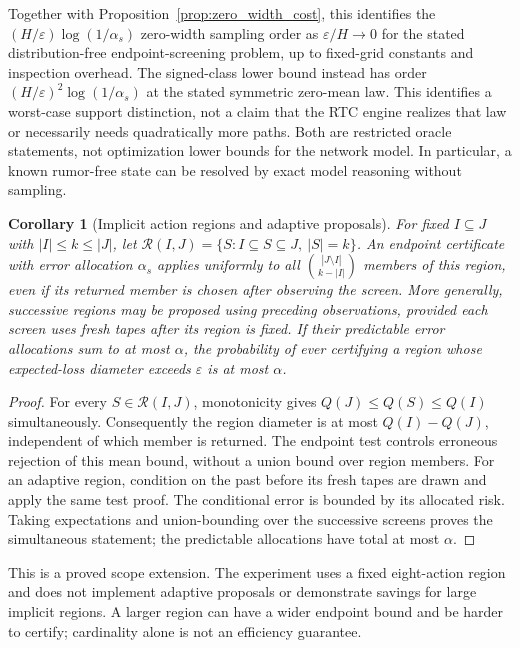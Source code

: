 \documentclass[preprint,11pt,sort&compress]{elsarticle}
\newtheorem{corollary}[theorem]{Corollary}
\begin{document}
Together with Proposition~\ref{prop:zero_width_cost}, this identifies the
$ (H/\varepsilon)\log(1/\alpha_s)$ zero-width sampling order as $\varepsilon/H\to0$ for the stated
distribution-free endpoint-screening problem, up to fixed-grid constants
and inspection overhead. The signed-class lower bound instead has order
$(H/\varepsilon)^2\log(1/\alpha_s)$ at the stated symmetric zero-mean
law. This identifies a worst-case support distinction, not a claim that
the RTC engine realizes that law or necessarily needs quadratically more
paths. Both are restricted oracle statements, not optimization lower
bounds for the network model. In particular, a known
rumor-free state can be resolved by exact model reasoning without sampling.

\begin{corollary}[Implicit action regions and adaptive proposals]
\label{cor:implicit_region}
For fixed $I\subseteq J$ with $|I|\le k\le|J|$, let
$\mathcal R(I,J)=\{S:I\subseteq S\subseteq J,\ |S|=k\}$. An endpoint
certificate with error allocation $\alpha_s$ applies uniformly to all
$\binom{|J\setminus I|}{k-|I|}$ members of this region, even if its returned
member is chosen after observing the screen. More generally, successive
regions may be proposed using preceding observations, provided each screen
uses fresh tapes after its region is fixed. If their predictable error
allocations sum to at most $\alpha$, the probability of ever certifying a
region whose expected-loss diameter exceeds $\varepsilon$ is at most
$\alpha$.
\end{corollary}
\begin{proof}
For every $S\in\mathcal R(I,J)$, monotonicity gives
$Q(J)\le Q(S)\le Q(I)$ simultaneously. Consequently the region diameter is
at most $Q(I)-Q(J)$, independent of which member is returned. The endpoint
test controls erroneous rejection of this mean bound, without a union
bound over region members. For an adaptive region, condition on the past
before its fresh tapes are drawn and apply the same test proof. The
conditional error is bounded by its allocated risk. Taking expectations
and union-bounding over the successive screens proves the simultaneous
statement; the predictable allocations have total at most $\alpha$.
\end{proof}
This is a proved scope extension. The experiment uses a fixed eight-action
region and does not implement adaptive proposals or demonstrate savings
for large implicit regions. A larger region can have a wider endpoint
bound and be harder to certify; cardinality alone is not an efficiency
guarantee.
\end{document}
